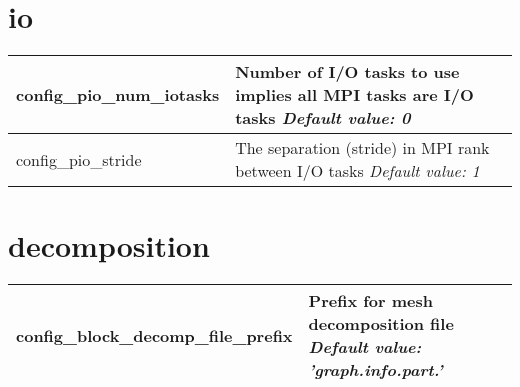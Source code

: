 \section{io}

{\small
\begin{longtable}{|p{1.75in} |p{4.5in}|}
 \hline
   config\_pio\_num\_iotasks        & Number of I/O tasks to use \hfill\break 0 implies all MPI tasks are I/O tasks \newline 
   {\em Default value: 0} \\ \hline

   config\_pio\_stride        & The separation (stride) in MPI rank between I/O tasks \newline 
   {\em Default value: 1} \\ \hline
   
\end{longtable}
}

\section{decomposition}

{\small
\begin{longtable}{|p{1.75in} |p{4.5in}|}
 \hline
   config\_block\_decomp\_file\_prefix & Prefix for mesh decomposition file \newline 
   {\em Default value: 'graph.info.part.'}  \\ \hline

\end{longtable}
}

